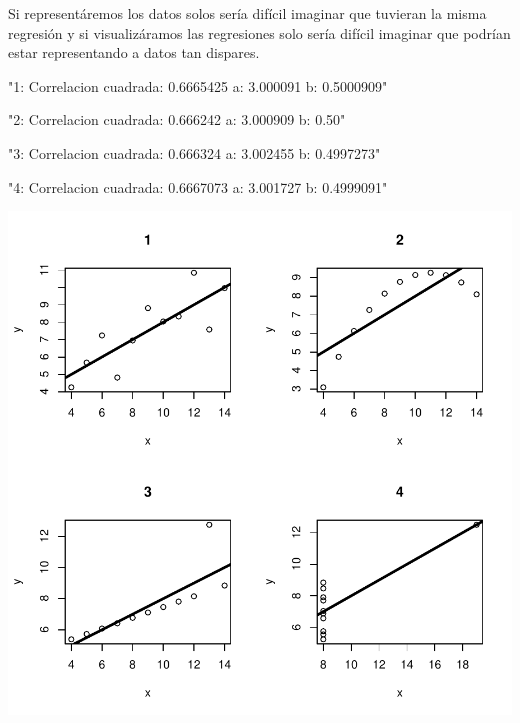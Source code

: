 \documentclass [a4paper] {article}
\begin{document}
Si representáremos los datos solos sería difícil imaginar que tuvieran la misma regresión y si visualizáramos las regresiones solo sería difícil imaginar que podrían estar representando a datos tan dispares.
\begin{Schunk}
\begin{Soutput}
[1] "1: Correlacion cuadrada: 0.6665425 a: 3.000091 b: 0.5000909"
\end{Soutput}
\begin{Soutput}
[1] "2: Correlacion cuadrada: 0.666242 a: 3.000909 b: 0.50"
\end{Soutput}
\begin{Soutput}
[1] "3: Correlacion cuadrada: 0.666324 a: 3.002455 b: 0.4997273"
\end{Soutput}
\begin{Soutput}
[1] "4: Correlacion cuadrada: 0.6667073 a: 3.001727 b: 0.4999091"
\end{Soutput}
\end{Schunk}

\begin{center}
\includegraphics{entrega-plot_regresion4}
\end{center}
\end{document}
